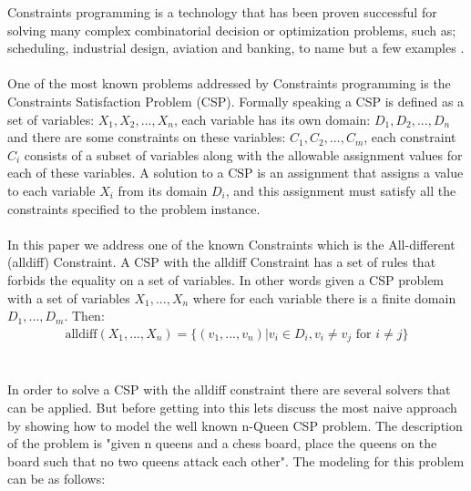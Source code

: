 Constraints programming is a technology that has been proven successful for solving many complex combinatorial decision or optimization problems, such as; scheduling, industrial design, aviation and banking, to name but a few examples \cite{ml:csd}.
\\
\\
One of the most known problems addressed by Constraints programming is the Constraints Satisfaction Problem (CSP). Formally speaking a CSP is defined as a set of variables: $X_{1}, X_{2},...,X_{n}$, each variable has its own domain: $D_{1}, D_{2},...,D_{n}$ and there are some constraints on these variables: $C_{1}, C_{2},...,C_{m}$, each constraint $C_{i}$ consists of a subset of variables along with the allowable assignment values for each of these variables. A solution to a CSP is an assignment that assigns a value to each variable $X_{i}$ from its domain $D_{i}$, and this assignment must satisfy all the constraints specified to the problem instance.
\\
\\
In this paper we address one of the known Constraints which is the All-different (alldiff) Constraint. A CSP with the alldiff Constraint has a set of rules that forbids the equality on a set of variables. In other words given a CSP problem with a set of variables $X_{1},...,X_{n}$  where for each variable there is a finite domain $D_{1},...,D_{m}$. Then:
\begin{eqnarray*}
\textrm{alldiff}(X_{1},...,X_{n}) = \{(v_{1},...,v_{n}) | v_{i} \in D_{i}, v_{i} \neq v_{j} \textrm{ for } i \neq j\}
\end{eqnarray*}
\\
\\

In order to solve a CSP with the alldiff constraint there are several solvers that can be applied. But before getting into this lets discuss the most naive approach by showing how to model the well known n-Queen CSP problem. The description of the problem is "given n queens and a chess board, place the queens on the board such that no two queens attack each other". The modeling for this problem can be as follows:
